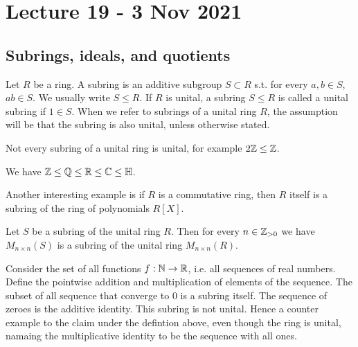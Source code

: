\section{Lecture 19 - 3 Nov 2021}
\subsection{Subrings, ideals, and quotients}
\begin{definition}
  Let $R$ be a ring. A subring is an additive subgroup $S\subset R$ s.t. for every
  $a,b\in S$, $ab\in S$. We usually write $S\leq R$. If $R$ is unital, a subring $S\leq R$
  is called a unital subring if $1\in S$. 
  When we refer to subrings of a unital ring $R$, the assumption will be that the subring is also unital, unless otherwise stated.
  \label{<+label+>}
\end{definition}
Not every subring of a unital ring is unital, for example $2\mathbb Z \leq \mathbb Z$.

\begin{example}
  We have $\mathbb Z \leq \mathbb Q \leq \mathbb R \leq \mathbb C \leq \mathbb H$.

  Another interesting example is if $R$ is a commutative ring, then $R$ itself is a
  subring of the ring of polynomials $R[X]$.

  Let $S$ be a subring of the unital ring $R$. Then for every $n\in\mathbb Z_{>0}$ we have
  $M_{n\times n}(S)$ is a subring of the unital ring $M_{n\times n}(R)$.

  Consider the set of all functions $f:\mathbb N\to\mathbb R$, i.e. all sequences of real numbers.
  Define the pointwise addition and multiplication of elements of the sequence. The subset
  of all sequence that converge to $0$ is a subring itself. The sequence of zeroes is the
  additive identity. This subring is not unital. Hence a counter example to the claim
  under the defintion above, even though the ring is unital, namaing the multiplicative
  identity to be the sequence with all ones. 
\end{example}


